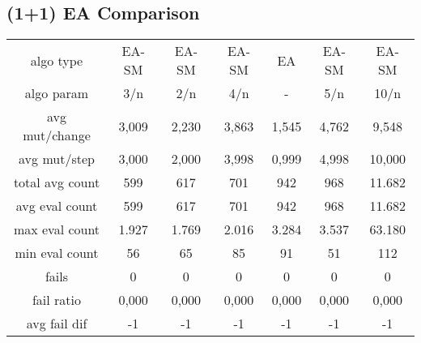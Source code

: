 \subsection{(1+1) EA Comparison}

\begin{tabular}[h]{ccccccc}
algo type&             EA-SM&      EA-SM&      EA-SM&         EA&      EA-SM&      EA-SM\\
algo param&              3/n&        2/n&        4/n&          -&        5/n&       10/n\\
avg mut/change&        3,009&      2,230&      3,863&      1,545&      4,762&      9,548\\
avg mut/step&          3,000&      2,000&      3,998&      0,999&      4,998&     10,000\\
\hline
total avg count&         599&        617&        701&        942&        968&     11.682\\
avg eval count&          599&        617&        701&        942&        968&     11.682\\
max eval count&        1.927&      1.769&      2.016&      3.284&      3.537&     63.180\\
min eval count&           56&         65&         85&         91&         51&        112\\
\hline
fails&                     0&          0&          0&          0&          0&          0\\
fail ratio&            0,000&      0,000&      0,000&      0,000&      0,000&      0,000\\
avg fail dif&             -1&         -1&         -1&         -1&         -1&         -1\\
\end{tabular}

